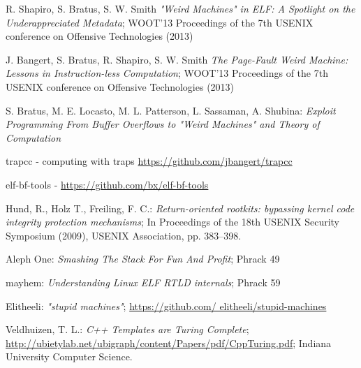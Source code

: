 \documentclass[11pt,twoside,a4paper]{article}
\begin{document}
\begin{thebibliography}{12}
 R. Shapiro, S. Bratus, S. W. Smith {\sl "Weird Machines" in ELF: A Spotlight on the Underappreciated Metadata}; WOOT'13 Proceedings of the 7th USENIX conference on Offensive Technologies (2013)

 J. Bangert, S. Bratus, R. Shapiro, S. W. Smith {\sl The Page-Fault Weird Machine: Lessons in Instruction-less Computation};  WOOT'13 Proceedings of the 7th USENIX conference on Offensive Technologies (2013)

 S. Bratus, M. E. Locasto, M. L. Patterson, L. Sassaman, A. Shubina: {\sl Exploit Programming From Buffer Overflows to "Weird Machines" and Theory of Computation}

 trapcc - computing with traps \url{https://github.com/jbangert/trapcc}

 elf-bf-tools - \url{https://github.com/bx/elf-bf-tools}

 Hund, R., Holz T., Freiling, F. C.: {\sl Return-oriented rootkits: bypassing kernel code integrity protection mechanisms}; In Proceedings of the 18th USENIX Security Symposium (2009), USENIX Association, pp. 383–398.

 Aleph One: {\sl Smashing The Stack For Fun And Profit}; Phrack 49

 mayhem: {\sl Understanding Linux ELF RTLD internals}; Phrack 59

 Elitheeli: {\sl "stupid machines"}; \url{https://github.com/ elitheeli/stupid-machines}

 Veldhuizen, T. L.:  {\sl C++ Templates are Turing Complete}; \url{http://ubietylab.net/ubigraph/content/Papers/pdf/CppTuring.pdf}; Indiana University Computer Science.
\end{thebibliography}
\end{document}

